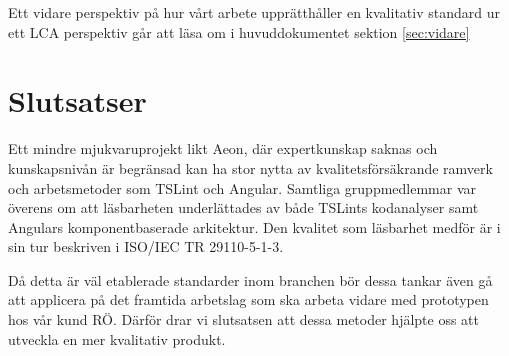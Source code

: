 Ett vidare perspektiv på hur vårt arbete upprätthåller en kvalitativ standard ur ett LCA perspektiv går att läsa om i huvuddokumentet sektion \ref{sec:vidare}

\section{Slutsatser}

Ett mindre mjukvaruprojekt likt Aeon, där expertkunskap saknas och kunskapsnivån är begränsad kan ha stor nytta av kvalitetsförsäkrande ramverk och arbetsmetoder som TSLint och Angular. 
Samtliga gruppmedlemmar var överens om att läsbarheten underlättades av både TSLints kodanalyser samt Angulars komponentbaserade arkitektur.
Den kvalitet som läsbarhet medför är i sin tur beskriven i ISO/IEC TR 29110-5-1-3.

Då detta är väl etablerade standarder inom branchen bör dessa tankar även gå att applicera på det framtida arbetslag som ska arbeta vidare med prototypen hos vår kund RÖ. Därför drar vi slutsatsen att dessa metoder hjälpte oss att utveckla en mer kvalitativ produkt.

